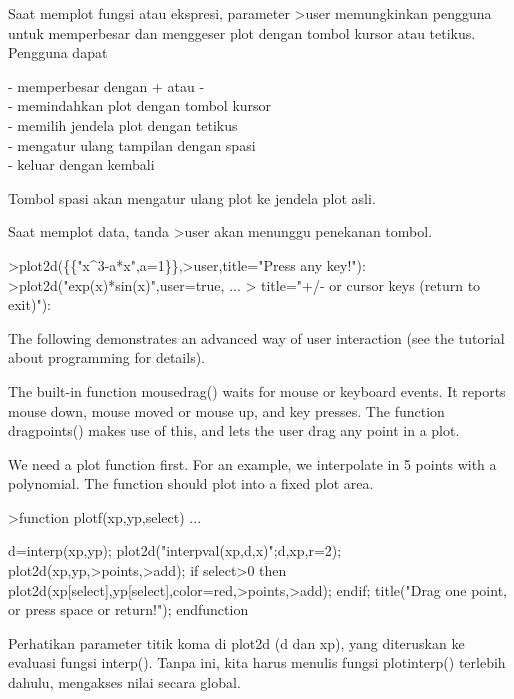 \documentclass[a4paper,10pt]{article}
\begin{document}
\begin{eulernotebook}
\begin{eulercomment}
\begin{eulercomment}
\begin{eulercomment}
\begin{eulercomment}
\begin{eulercomment}
\begin{eulercomment}
\begin{eulercomment}
\begin{eulercomment}
\begin{eulercomment}
\begin{eulercomment}
\begin{eulercomment}
\begin{eulercomment}
\begin{eulercomment}
\end{eulercomment}
\begin{eulercomment}
Saat memplot fungsi atau ekspresi, parameter \textgreater{}user memungkinkan
pengguna untuk memperbesar dan menggeser plot dengan tombol kursor
atau tetikus. Pengguna dapat

- memperbesar dengan + atau -\\
- memindahkan plot dengan tombol kursor\\
- memilih jendela plot dengan tetikus\\
- mengatur ulang tampilan dengan spasi\\
- keluar dengan kembali

Tombol spasi akan mengatur ulang plot ke jendela plot asli.

Saat memplot data, tanda \textgreater{}user akan menunggu penekanan tombol.
\end{eulercomment}
\begin{eulerprompt}
>plot2d(\{\{"x^3-a*x",a=1\}\},>user,title="Press any key!"):
>plot2d("exp(x)*sin(x)",user=true, ...
>  title="+/- or cursor keys (return to exit)"):
\end{eulerprompt}
\begin{eulercomment}
The following demonstrates an advanced way of user interaction (see
the tutorial about programming for details).

The built-in function mousedrag() waits for mouse or keyboard events.
It reports mouse down, mouse moved or mouse up, and key presses. The
function dragpoints() makes use of this, and lets the user drag any
point in a plot.

We need a plot function first. For an example, we interpolate in 5
points with a polynomial. The function should plot into a fixed plot
area.
\end{eulercomment}
\begin{eulerprompt}
>function plotf(xp,yp,select) ...
\end{eulerprompt}
\begin{eulerudf}
  d=interp(xp,yp);
    plot2d("interpval(xp,d,x)";d,xp,r=2);
    plot2d(xp,yp,>points,>add);
    if select>0 then
      plot2d(xp[select],yp[select],color=red,>points,>add);
    endif;
    title("Drag one point, or press space or return!");
  endfunction
  
\end{eulerudf}
\begin{eulercomment}
Perhatikan parameter titik koma di plot2d (d dan xp), yang diteruskan
ke evaluasi fungsi interp(). Tanpa ini, kita harus menulis fungsi
plotinterp() terlebih dahulu, mengakses nilai secara global.


\end{eulercomment}
\end{eulercomment}
\end{eulercomment}
\end{eulercomment}
\end{eulercomment}
\end{eulercomment}
\end{eulercomment}
\end{eulercomment}
\end{eulercomment}
\end{eulercomment}
\end{eulercomment}
\end{eulercomment}
\end{eulercomment}
\end{eulernotebook}
\end{document}
